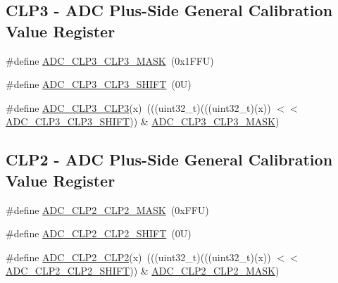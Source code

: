 \subsection*{C\+L\+P3 -\/ A\+DC Plus-\/\+Side General Calibration Value Register}
\begin{DoxyCompactItemize}
\item 
\#define \mbox{\hyperlink{group___a_d_c___register___masks_gaeae73e0daf3e9a9174024850a719768d}{A\+D\+C\+\_\+\+C\+L\+P3\+\_\+\+C\+L\+P3\+\_\+\+M\+A\+SK}}~(0x1\+F\+F\+U)
\item 
\#define \mbox{\hyperlink{group___a_d_c___register___masks_ga9eef257b72d4181481aa5e3bf0a85732}{A\+D\+C\+\_\+\+C\+L\+P3\+\_\+\+C\+L\+P3\+\_\+\+S\+H\+I\+FT}}~(0\+U)
\item 
\#define \mbox{\hyperlink{group___a_d_c___register___masks_ga3f0884b7fa6046cdcb1cce1eb2511baf}{A\+D\+C\+\_\+\+C\+L\+P3\+\_\+\+C\+L\+P3}}(x)~(((uint32\+\_\+t)(((uint32\+\_\+t)(x)) $<$$<$ \mbox{\hyperlink{group___a_d_c___register___masks_ga9eef257b72d4181481aa5e3bf0a85732}{A\+D\+C\+\_\+\+C\+L\+P3\+\_\+\+C\+L\+P3\+\_\+\+S\+H\+I\+FT}})) \& \mbox{\hyperlink{group___a_d_c___register___masks_gaeae73e0daf3e9a9174024850a719768d}{A\+D\+C\+\_\+\+C\+L\+P3\+\_\+\+C\+L\+P3\+\_\+\+M\+A\+SK}})
\end{DoxyCompactItemize}
\subsection*{C\+L\+P2 -\/ A\+DC Plus-\/\+Side General Calibration Value Register}
\begin{DoxyCompactItemize}
\item 
\#define \mbox{\hyperlink{group___a_d_c___register___masks_ga2d10a369ac0c13f4ee3535e9f45a5d17}{A\+D\+C\+\_\+\+C\+L\+P2\+\_\+\+C\+L\+P2\+\_\+\+M\+A\+SK}}~(0x\+F\+F\+U)
\item 
\#define \mbox{\hyperlink{group___a_d_c___register___masks_ga071963a7a6ff4f1b72c79c66aee09043}{A\+D\+C\+\_\+\+C\+L\+P2\+\_\+\+C\+L\+P2\+\_\+\+S\+H\+I\+FT}}~(0\+U)
\item 
\#define \mbox{\hyperlink{group___a_d_c___register___masks_ga9b88c4499b2da56a5919cb15dcdc5dab}{A\+D\+C\+\_\+\+C\+L\+P2\+\_\+\+C\+L\+P2}}(x)~(((uint32\+\_\+t)(((uint32\+\_\+t)(x)) $<$$<$ \mbox{\hyperlink{group___a_d_c___register___masks_ga071963a7a6ff4f1b72c79c66aee09043}{A\+D\+C\+\_\+\+C\+L\+P2\+\_\+\+C\+L\+P2\+\_\+\+S\+H\+I\+FT}})) \& \mbox{\hyperlink{group___a_d_c___register___masks_ga2d10a369ac0c13f4ee3535e9f45a5d17}{A\+D\+C\+\_\+\+C\+L\+P2\+\_\+\+C\+L\+P2\+\_\+\+M\+A\+SK}})
\end{DoxyCompactItemize}
